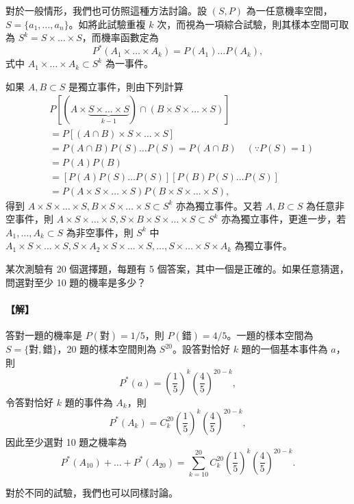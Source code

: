 對於一般情形，我們也可仿照這種方法討論。設 $(S, P)$ 為一任意機率空間，$S = \{a_1, \dots, a_n\}$。如將此試驗重複 $k$ 次，而視為一項綜合試驗，則其樣本空間可取為 $S^k = S \times \dots \times S$，而機率函數定為
\[
P^*(A_1 \times \dots \times A_k) = P(A_1) \dots P(A_k),
\]
式中 $A_1 \times \dots \times A_k \subset S^k$ 為一事件。

如果 $A, B \subset S$ 是獨立事件，則由下列計算
\begin{align*}
& P[(A \times \underbrace{S \times \dots \times S}_{k-1}) \cap (B \times S \times \dots \times S)] \\
&= P[(A \cap B) \times S \times \dots \times S] \\
&= P(A \cap B) P(S) \dots P(S) = P(A \cap B) \quad (\because P(S) = 1) \\
&= P(A)P(B) \\
&= [P(A) P(S) \dots P(S)][P(B) P(S) \dots P(S)] \\
&= P(A \times S \times \dots \times S) P(B \times S \times \dots \times S),
\end{align*}
得到 $A \times S \times \dots \times S, B \times S \times \dots \times S \subset S^k$ 亦為獨立事件。又若 $A, B \subset S$ 為任意非空事件，則 $A \times S \times \dots \times S, S \times B \times S \times \dots \times S \subset S^k$ 亦為獨立事件，更進一步，若 $A_1, \dots, A_k \subset S$ 為非空事件，則 $S^k$ 中 $A_1 \times S \times \dots \times S, S \times A_2 \times S \times \dots \times S, \dots, S \times \dots \times S \times A_k$ 為獨立事件。

\medskip
\begin{example}\label{ex:b5-4-16}
某次測驗有 20 個選擇題，每題有 5 個答案，其中一個是正確的。如果任意猜選，問選對至少 10 題的機率是多少？
\end{example}
\paragraph{【解】}
答對一題的機率是 $P(\text{對}) = 1/5$，則 $P(\text{錯}) = 4/5$。一題的樣本空間為 $S = \{\text{對}, \text{錯}\}$，20 題的樣本空間則為 $S^{20}$。設答對恰好 $k$ 題的一個基本事件為 $a$，則
\[
P^*(a) = \left(\frac{1}{5}\right)^k \left(\frac{4}{5}\right)^{20-k},
\]
令答對恰好 $k$ 題的事件為 $A_k$，則
\[
P^*(A_k) = C^{20}_k \left(\frac{1}{5}\right)^k \left(\frac{4}{5}\right)^{20-k},
\]
因此至少選對 10 題之機率為
\[
P^*(A_{10}) + \dots + P^*(A_{20}) = \sum_{k=10}^{20} C^{20}_k \left(\frac{1}{5}\right)^k \left(\frac{4}{5}\right)^{20-k}. \tag*{\#}
\]

對於不同的試驗，我們也可以同樣討論。

